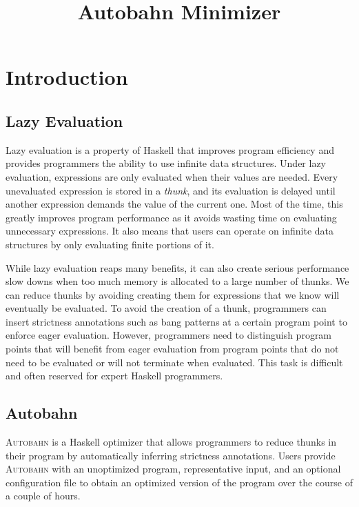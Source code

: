\documentclass[format=sigplan]{acmart}
\begin{document}
\title{Autobahn Minimizer}
\maketitle

\begin{abstract}
\end{abstract}

\section{Introduction}

\subsection{Lazy Evaluation}

Lazy evaluation is a property of Haskell that improves program efficiency and provides programmers the ability to use infinite data structures. Under lazy evaluation, expressions are only evaluated when their values are needed. Every unevaluated expression is stored in a \textit{thunk}, and its evaluation is delayed until another expression demands the value of the current one. Most of the time, this greatly improves program performance as it avoids wasting time on evaluating unnecessary expressions. It also means that users can operate on infinite data structures by only evaluating finite portions of it.

While lazy evaluation reaps many benefits, it can also create serious performance slow downs when too much memory is allocated to a large number of thunks. We can reduce thunks by avoiding creating them for expressions that we know will eventually be evaluated. To avoid the creation of a thunk, programmers can insert strictness annotations such as bang patterns at a certain program point to enforce eager evaluation. However, programmers need to distinguish program points that will benefit from eager evaluation from program points that do not need to be evaluated or will not terminate when evaluated. This task is difficult and often reserved for expert Haskell programmers. 

\subsection{Autobahn}

\textsc{Autobahn} is a Haskell optimizer that allows programmers to reduce thunks in their program by automatically inferring strictness annotations. Users provide \textsc{Autobahn} with an unoptimized program, representative input, and an optional configuration file to obtain an optimized version of the program over the course of a couple of hours. 
\end{document}
